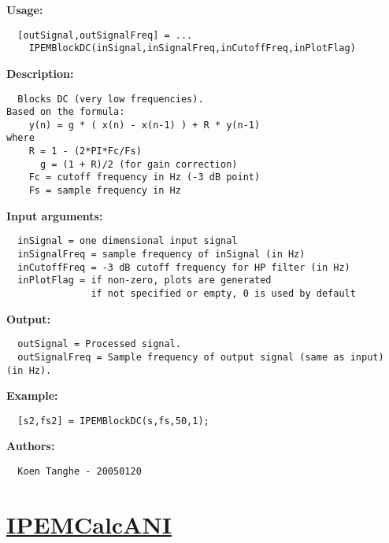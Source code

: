 \textbf{Usage:}
\begin{verbatim}  [outSignal,outSignalFreq] = ...
    IPEMBlockDC(inSignal,inSignalFreq,inCutoffFreq,inPlotFlag)

\end{verbatim}
\textbf{Description:}
\begin{verbatim}  Blocks DC (very low frequencies).
Based on the formula:
	y(n) = g * ( x(n) - x(n-1) ) + R * y(n-1)
where
	R = 1 - (2*PI*Fc/Fs)
      g = (1 + R)/2 (for gain correction)
	Fc = cutoff frequency in Hz (-3 dB point)
	Fs = sample frequency in Hz

\end{verbatim}
\textbf{Input arguments:}
\begin{verbatim}  inSignal = one dimensional input signal
  inSignalFreq = sample frequency of inSignal (in Hz)
  inCutoffFreq = -3 dB cutoff frequency for HP filter (in Hz)
  inPlotFlag = if non-zero, plots are generated
               if not specified or empty, 0 is used by default

\end{verbatim}
\textbf{Output:}
\begin{verbatim}  outSignal = Processed signal.
  outSignalFreq = Sample frequency of output signal (same as input) (in Hz).

\end{verbatim}
\textbf{Example:}
\begin{verbatim}  [s2,fs2] = IPEMBlockDC(s,fs,50,1);

\end{verbatim}
\textbf{Authors:}
\begin{verbatim}  Koen Tanghe - 20050120
\end{verbatim}


\newpage
\section*{\hyperlink{Concepts:IPEMCalcANI}{IPEMCalcANI}}
\hypertarget{FuncRef:IPEMCalcANI}{}

